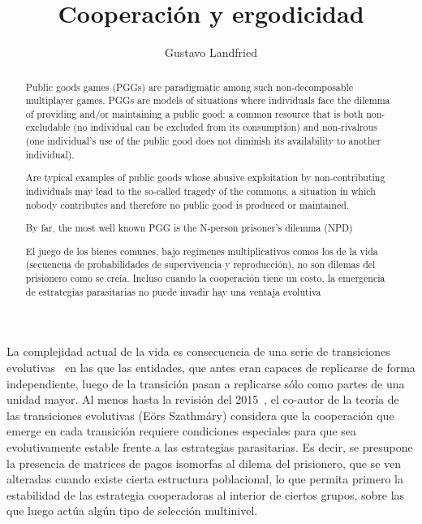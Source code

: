\documentclass[a4paper,10pt]{article}
\title{Cooperación y ergodicidad}
\author{Gustavo Landfried}
\begin{document}
\maketitle

\begin{abstract}
Public goods games (PGGs) are paradigmatic among such non-decomposable multiplayer games.
PGGs are models of situations where individuals face the dilemma of providing and/or maintaining a public good: a common resource that is both non-excludable (no individual can be excluded from its consumption) and non-rivalrous (one individual’s use of the public good does not diminish its availability to another individual).



Are typical examples of public goods whose abusive exploitation by non-contributing individuals may lead to the so-called tragedy of the commons, a situation in which nobody contributes and therefore no public good is produced or maintained.

By far, the most well known PGG is the N-person prisoner’s dilemma (NPD)


El juego de los bienes comunes, bajo regímenes multiplicativos comos los de la vida (secuencua de probabilidades de supervivencia y reproducción), no son dilemas del prisionero como se creía.
Incluso cuando la cooperación tiene un costo, la emergencia de estrategias parasitarias no puede invadir  hay una ventaja evolutiva 
\end{abstract}


La complejidad actual de la vida es consecuencia de una serie de transiciones evolutivas~\cite{maynardSmith1995-majorTransitions} en las que las entidades, que antes eran capaces de replicarse de forma independiente, luego de la transición pasan a replicarse sólo como partes de una unidad mayor.
Al menos hasta la revisión del 2015~\cite{szathmary2015-evolutionaryTransitions}, el co-autor de la teoría de las transiciones evolutivas (Eörs Szathmáry) considera que la cooperación que emerge en cada transición requiere condiciones especiales para que sea evolutivamente estable frente a las estrategias parasitarias.
Es decir, se presupone la presencia de matrices de pagos isomorfas al dilema del prisionero, que se ven alteradas cuando existe cierta estructura poblacional, lo que permita primero la estabilidad de las estrategia cooperadoras al interior de ciertos grupos, sobre las que luego actúa algún tipo de selección multinivel.

\end{document}

